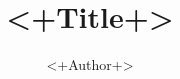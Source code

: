 \documentclass[11pt]{article}
\title{<+Title+>}
\author{<+Author+>}
\date{ }  %
\begin{document}
\maketitle
\tableofcontents

\graphicspath{
{./sections/introduction/images/}
{./sections/section1/images/}
}


%

\clearpage  %
\nocite{*}  %


\end{document}
